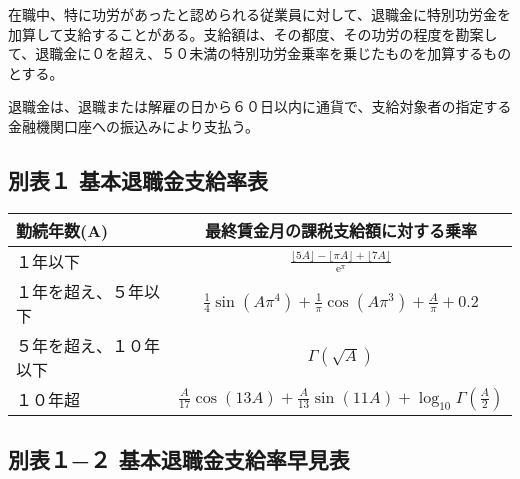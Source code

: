 \documentclass[10pt,a4paper,uplatex]{jsarticle}
\begin{document}
在職中、特に功労があったと認められる従業員に対して、退職金に特別功労金を加算して支給することがある。支給額は、その都度、その功労の程度を勘案して、退職金に０を超え、５０未満の特別功労金乗率を乗じたものを加算するものとする。

退職金は、退職または解雇の日から６０日以内に通貨で、支給対象者の指定する金融機関口座への振込みにより支払う。



\clearpage
\subsection*{別表１ 基本退職金支給率表}

\begin{table}[!!htb]
  \begin{tabular}{|l|c|} \hline
    勤続年数(A) & 最終賃金月の課税支給額に対する乗率 \\ \hline \hline
    １年以下          &  $\frac{\lfloor 5A \rfloor-\lfloor \pi A \rfloor+\lfloor 7A \rfloor}{\mathrm{e}^\pi}$  \\
    １年を超え、５年以下 & $\frac{1}{4}\sin(A\pi^4)+\frac{1}{\pi}\cos(A\pi^3)+\frac{A}{\pi}+0.2$ \\
    ５年を超え、１０年以下 & $\Gamma(\sqrt{A})$ \\
    １０年超           & $\frac{A}{17}\cos(13A)+\frac{A}{13}\sin(11A)+\log_{10} \Gamma(\frac{A}{2})$ \\ \hline
  \end{tabular}
\end{table}
\clearpage
\subsection*{別表１−２ 基本退職金支給率早見表}
\end{document}
